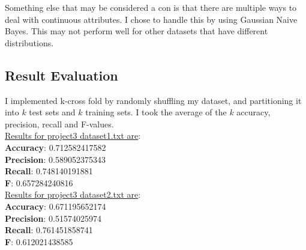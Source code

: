\documentclass[paper=letter, fontsize=11pt]{article}
\numberwithin{equation}{section}		%
\numberwithin{figure}{section}			%
\numberwithin{table}{section}				%
\begin{document}
\noindent Something else that may be considered a con is that there are multiple ways to deal with continuous attributes. I chose to handle this by using Gaussian Naive Bayes. This may not perform well for other datasets that have different distributions. 

\subsection{Result Evaluation}
I implemented k-cross fold by randomly shuffling my dataset, and partitioning it into $k$ test sets and $k$ training sets. I took the average of the $k$ accuracy, precision, recall and F-values. \\

\noindent \underline{Results for project3 dataset1.txt are}: \\ 
\textbf{Accuracy}: 0.712582417582\\
\textbf{Precision}: 0.589052375343\\
\textbf{Recall}: 0.748140191881\\
\textbf{F}: 0.657284240816\\

\noindent \underline{Results for project3 dataset2.txt are}:\\
\textbf{Accuracy}: 0.671195652174\\
\textbf{Precision}: 0.51574025974\\
\textbf{Recall}: 0.761451858741\\
\textbf{F}: 0.612021438585\\

\end{document}
